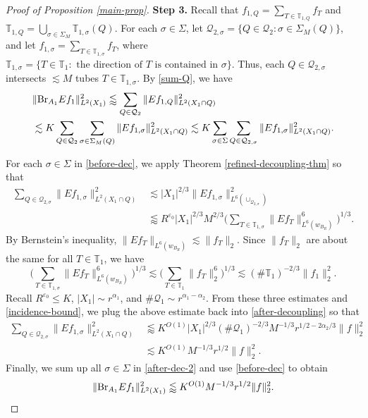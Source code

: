 \documentclass{amsart}
\numberwithin{equation}{section}
\newcommand{\al}{\alpha}
\newcommand{\e}{\varepsilon}
\newcommand{\si}{\sigma}
\newcommand{\Si}{\Sigma}
\newcommand{\cq}{\mathcal Q}
\newcommand{\ZT}{\mathbb{T}}
\newcommand{\BR}{{\rm{Br}}}
\begin{document}
\begin{proof}[Proof of Proposition \ref{main-prop}]
\medskip

{\bf Step 3.}
Recall that $f_{1,Q}=\sum_{T\in\ZT_{1,Q}}f_T$ and $\ZT_{1,Q}=\bigcup_{\si\in\Si_M}\ZT_{1,\si}(Q)$.
For each $\si\in\Si$, let $\cq_{2,\si}=\{Q\in\cq_2:\si\in\Si_M(Q)\}$, and let $f_{1,\si}=\sum_{T\in\ZT_{1,\si}}f_T$, where $\ZT_{1,\si}=\{T\in\ZT_1: \text{ the direction of $T$ is contained in $\si$}\}$.
Thus, each $Q\in\cq_{2,\si}$ intersects $\lesssim M$ tubes $T\in\ZT_{1,\si}$.
By \eqref{sum-Q}, we have
\begin{align}
     &\|\BR_{A_1} Ef_1\|_{L^2(X_1)}^2\lessapprox\sum_{Q\in\cq_2}\|Ef_{1,Q}\|_{L^2(X_1\cap Q)}^2\\ \label{before-dec}
     &\lesssim K\sum_{Q\in\cq_2}\sum_{\si\in\Si_M(Q)}\|Ef_{1,\si}\|_{L^2(X_1\cap Q)}^2
     \lesssim K\sum_{\si\in\Si}\sum_{Q\in\cq_{2,\si}}\|Ef_{1,\si}\|_{L^2(X_1\cap Q)}^2.
\end{align}

For each $\si\in \Si$ in \eqref{before-dec}, we apply Theorem \ref{refined-decoupling-thm} so that
\begin{align}
    \sum_{Q\in\cq_{2,\si}}\|Ef_{1,\si}\|_{L^2(X_1\cap Q)}^2&\lesssim |X_1|^{2/3}\|Ef_{1,\si}\|_{L^6(\cup_{\cq_{2,\si}})}^2\\ \label{after-decoupling}
    &\lessapprox R^{\e_0} |X_1|^{2/3}M^{2/3}\Big(\sum_{T\in\ZT_{1,\si}}\|Ef_T\|_{L^6(w_{B_R})}^6\Big)^{1/3}.
\end{align}
By Bernstein's inequality, $\|Ef_T\|_{L^6(w_{B_R})}\lesssim \|f_T\|_2$.
Since $\|f_T\|_2$ are about the same for all $T\in\ZT_1$, we have
\begin{equation}
    \Big(\sum_{T\in\ZT_{1,\si}}\|Ef_T\|_{L^6(w_{B_R})}^6\Big)^{1/3}\lesssim \Big(\sum_{T\in\ZT_{1}}\|f_T\|_{2}^6\Big)^{1/3}\lesssim (\#\ZT_1)^{-2/3}\|f_1\|_2^2.
\end{equation}
Recall $R^{\e_0}\leq K$, $|X_1|\sim r^{\al_1}$, and $\#\cq_1\sim r^{\al_1-\al_2}$.
From these three estimates and \eqref{incidence-bound}, we plug the above estimate back into \eqref{after-decoupling} so that
\begin{align}
\label{after-dec-2}
    \sum_{Q\in\cq_{2,\si}}\|Ef_{1,\si}\|_{L^2(X_1\cap Q)}^2&\lessapprox K^{O(1)}|X_1|^{2/3}(\#\cq_1)^{-2/3}M^{-1/3}r^{1/2-2\al_2/3}\|f\|_2^2\\
    &\lesssim K^{O(1)}M^{-1/3}r^{1/2}\|f\|_2^2.
\end{align}
Finally, we sum up all $\si\in\Si$ in \eqref{after-dec-2} and use \eqref{before-dec} to obtain
\begin{equation}
\label{second-estimate-3}
    \|\BR_{A_1} Ef_1\|_{L^2(X_1)}^2\lessapprox K^{O(1)}M^{-1/3}r^{1/2}\|f\|_2^2.
\end{equation}



\end{proof}
\end{document}
